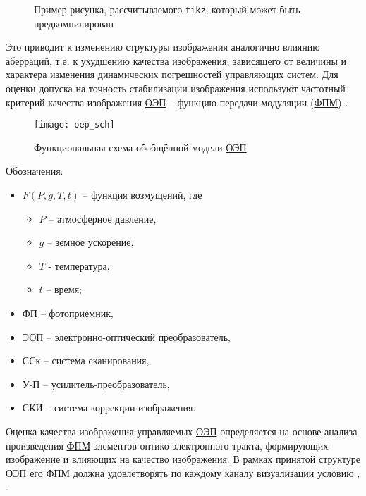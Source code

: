 \begin{figure}[ht]
	{\centering
		
		
	}
	\legend{}
	\caption[Пример \texttt{tikz} схемы]{Пример рисунка, рассчитываемого
		\texttt{tikz}, который может быть предкомпилирован}
	\label{fig:tikz_example}
\end{figure}


Это приводит к изменению структуры изображения аналогично влиянию аберраций, т.е. к ухудшению качества изображения, зависящего от величины и характера изменения динамических погрешностей управляющих систем. Для оценки допуска на точность стабилизации изображения используют частотный критерий качества изображения \hyperref[acroEOS]{ОЭП} – функцию передачи модуляции (\hyperref[acroFPM]{ФПМ}) \cite[]{Tarasov}.

\begin{figure}[ht]
	\centering
	\texttt{[image: oep\_sch]} 
	\caption{Функциональная схема обобщённой модели \hyperref[acroEOS]{ОЭП}}
	\label{fig:oep_sch}
\end{figure}

Обозначения: 
\begin{itemize}
	\item $F(P,g,T,t)$ – функция возмущений, где
	\begin{itemize}
		\item $P$ – атмосферное давление,
		\item $g$ – земное ускорение,
		\item $T$ - температура, 
		\item $t$ – время;
	\end{itemize}
	\item ФП – фотоприемник, 
	\item ЭОП – электронно-оптический преобразователь, 
	\item ССк – система сканирования, 
	\item У-П – усилитель-преобразователь, 
	\item СКИ – система коррекции изображения.
\end{itemize}

Оценка качества изображения управляемых \hyperref[acroEOS]{ОЭП} определяется на основе анализа произведения \hyperref[acroFPM]{ФПМ} элементов оптико-электронного тракта, формирующих изображение и влияющих на качество изображения. В рамках принятой структуре \hyperref[acroEOS]{ОЭП} его \hyperref[acroFPM]{ФПМ} должна удовлетворять по каждому каналу визуализации условию \cite[]{Ivanov18}, \cite[]{Molin21}.

